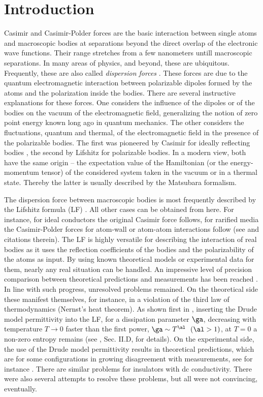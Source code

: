 \documentclass[notitlepage,prd,aps,longbibliography,twocolumn]{revtex4-1}
\begin{document}
\section{\label{T0}Introduction}
%
Casimir and Casimir-Polder forces are the basic interaction between single atoms and macroscopic bodies at separations beyond the direct overlap of the electronic wave functions. Their range stretches from a few nanometers untill macroscopic separations.  In  many areas of physics, and beyond, these are ubiquitous. Frequently, these are also called {\it dispersion forces} \cite{mahanty76}. These forces are due to the quantum electromagnetic interaction between polarizable dipoles formed by the atoms and  the polarization inside the bodies. There are several instructive explanations for these forces. One considers the influence of the dipoles or of the bodies  on the vacuum of the electromagnetic field, generalizing the notion of zero point energy known long ago in quantum mechanics. The other considers the fluctuations, quantum and thermal, of the electromagnetic field in the presence of the polarizable bodies. The first was pioneered by Casimir for ideally reflecting bodies \cite{casi48-51-793}, the second by Lifshitz \cite{lifs56-2-73} for polarizable bodies. In a modern view, both have the same origin -- the expectation value of the Hamiltonian (or the energy-momentum tensor) of the considered system taken  in the vacuum or in a thermal state. Thereby the latter is usually described by the Matsubara formalism.

The dispersion force between macroscopic bodies is most frequently described by the Lifshitz formula (LF) \cite{bara75-116-5}. All other cases can be obtained from here. For instance, for ideal conductors the original Casimir force follows, for rarified media the Casimir-Polder forces for atom-wall or atom-atom interactions follow (see \cite{BKMM} and citations therein). The LF is highly versatile for describing the interaction of real bodies as it uses the reflection coefficients of the bodies and the polarizability of the atoms as input. By using known theoretical models or experimental data for them, nearly any real situation can be handled. An impressive level of precision comparison between theoretical predictions and measurements has been reached \cite{klim09-81-1827}. In line with such progress, unresolved problems remained. On the theoretical side these manifest themselves, for instance, in a violation of the third law of thermodynamics (Nernst's heat theorem). As shown first in \cite{beze02-65-052113}, inserting the Drude model permittivity into the LF, for a dissipation parameter $\ga$, decreasing with temperature $T\to0$ faster than the first power, $\ga\sim T^\al\ \ (\al>1)$, at $T=0$ a non-zero entropy remains (see \cite{klim09-81-1827}, Sec. II.D, for details). On the experimental side, the use of the Drude model permittivity results in theoretical predictions, which are for some configurations in growing disagreement with measurements, see for instance \cite{bimo16-93-184434}. There are similar problems for insulators with dc conductivity. There were also several attempts to resolve these problems, but all were not convincing, eventually.
\end{document}
